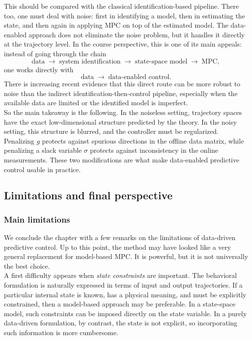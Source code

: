 This should be compared with the classical identification-based pipeline. There too, one must deal with noise: first in identifying a model, then in estimating the state, and then again in applying MPC on top of the estimated model. The data-enabled approach does not eliminate the noise problem, but it handles it directly at the trajectory level. In the course perspective, this is one of its main appeals: instead of going through the chain
\[
\text{data} \;\to\; \text{system identification} \;\to\; \text{state-space model} \;\to\; \text{MPC},
\]
one works directly with
\[
\text{data} \;\to\; \text{data-enabled control}.
\]
There is increasing recent evidence that this direct route can be more robust to noise than the indirect identification-then-control pipeline, especially when the available data are limited or the identified model is imperfect.\\

So the main takeaway is the following. In the noiseless setting, trajectory spaces have the exact low-dimensional structure predicted by the theory. In the noisy setting, this structure is blurred, and the controller must be regularized. Penalizing \(g\) protects against spurious directions in the offline data matrix, while penalizing a slack variable \(\sigma\) protects against inconsistency in the online measurements. These two modifications are what make data-enabled predictive control usable in practice.\\
\subsection{Limitations and final perspective}
\subsubsection{Main limitations}
We conclude the chapter with a few remarks on the limitations of data-driven predictive control. Up to this point, the method may have looked like a very general replacement for model-based MPC. It is powerful, but it is not universally the best choice.\\
A first difficulty appears when \emph{state constraints} are important. The behavioral formulation is naturally expressed in terms of input and output trajectories. If a particular internal state is known, has a physical meaning, and must be explicitly constrained, then a model-based approach may be preferable. In a state-space model, such constraints can be imposed directly on the state variable. In a purely data-driven formulation, by contrast, the state is not explicit, so incorporating such information is more cumbersome.\\

